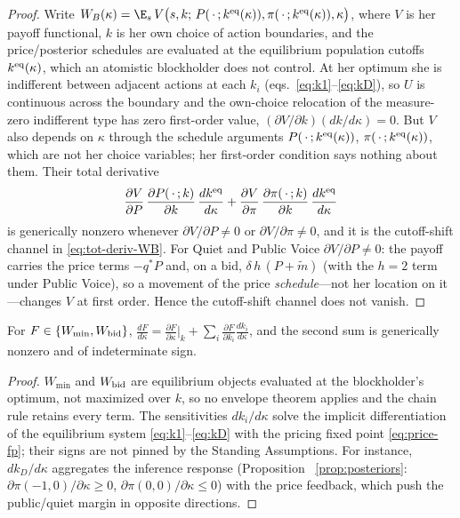 \begin{proof}
Write $W_B(\kappa)=\E_s\,V\big(s,k;\,P(\,\cdot\,;k^{\textup{eq}}(\kappa)),
\pi(\,\cdot\,;k^{\textup{eq}}(\kappa)),\kappa\big)$, where $V$ is her payoff
functional, $k$ is her own choice of action boundaries, and the price/posterior
schedules are evaluated at the equilibrium population cutoffs
$k^{\textup{eq}}(\kappa)$, which an atomistic blockholder does not control. At her
optimum she is indifferent between adjacent actions at each $k_i$
(eqs.~\eqref{eq:k1}--\eqref{eq:kD}), so $U$ is continuous across the boundary and
the own-choice relocation of the measure-zero indifferent type has zero
first-order value, $(\partial V/\partial k)(dk/d\kappa)=0$. But $V$ also depends
on $\kappa$ through the schedule arguments $P(\,\cdot\,;k^{\textup{eq}}(\kappa))$,
$\pi(\,\cdot\,;k^{\textup{eq}}(\kappa))$, which are not her choice variables; her
first-order condition says nothing about them. Their total derivative
\begin{equation}
\frac{\partial V}{\partial P}\,\frac{\partial P(\,\cdot\,;k)}{\partial k}\,
   \frac{dk^{\textup{eq}}}{d\kappa}
+\frac{\partial V}{\partial\pi}\,\frac{\partial\pi(\,\cdot\,;k)}{\partial k}\,
   \frac{dk^{\textup{eq}}}{d\kappa}
\label{eq:schedule-channel}
\end{equation}
is generically nonzero whenever $\partial V/\partial P\neq0$ or
$\partial V/\partial\pi\neq0$, and it is the cutoff-shift channel in
\eqref{eq:tot-deriv-WB}. For Quiet and Public Voice $\partial V/\partial P\neq0$:
the payoff carries the price terms $-q^{\ast}P$ and, on a bid, $\delta\,h\,(P+
\tilde m)$ (with the $h{=}2$ term under Public Voice), so a movement of the price
\emph{schedule}---not her location on it---changes $V$ at first order. Hence the
cutoff-shift channel does not vanish.
\end{proof}

\begin{lemma}
\label{lem:no-env-other}
For $F\in\{W_{\min},W_{\textup{bid}}\}$,
$\frac{dF}{d\kappa}=\frac{\partial F}{\partial\kappa}\big|_{k}
 +\sum_{i}\frac{\partial F}{\partial k_i}\frac{dk_i}{d\kappa}$, and the second
sum is generically nonzero and of indeterminate sign.
\end{lemma}

\begin{proof}
$W_{\min}$ and $W_{\textup{bid}}$ are equilibrium objects evaluated at the
blockholder's optimum, not maximized over $k$, so no envelope theorem applies and
the chain rule retains every term. The sensitivities $dk_i/d\kappa$ solve the
implicit differentiation of the equilibrium system
\eqref{eq:k1}--\eqref{eq:kD} with the pricing fixed point \eqref{eq:price-fp};
their signs are not pinned by the Standing Assumptions. For instance,
$dk_D/d\kappa$ aggregates the inference response (Proposition~%
\ref{prop:posteriors}: $\partial\pi(-1,0)/\partial\kappa\ge0$,
$\partial\pi(0,0)/\partial\kappa\le0$) with the price feedback, which push the
public/quiet margin in opposite directions.
\end{proof}

